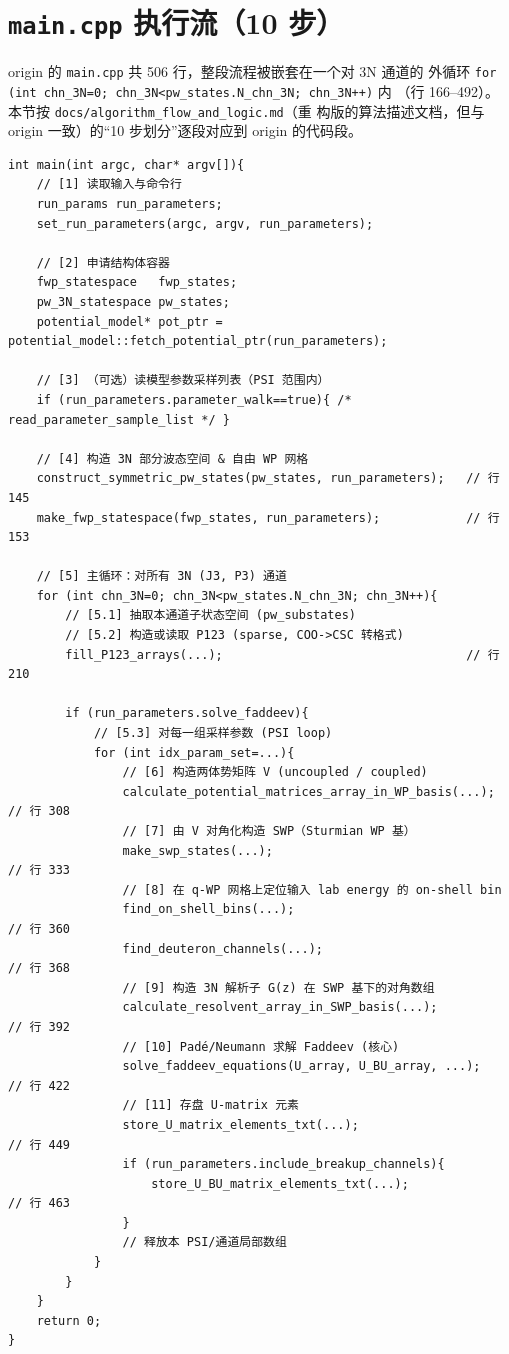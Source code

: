 \section{\texttt{main.cpp} 执行流（10 步）}
\label{sec:ch18-mainflow}

origin 的 \texttt{main.cpp} 共 506 行，整段流程被嵌套在一个对 3N 通道的
外循环 \texttt{for (int chn\_3N=0; chn\_3N<pw\_states.N\_chn\_3N; chn\_3N++)} 内
（行 166--492）。本节按 \texttt{docs/algorithm\_flow\_and\_logic.md}（重
构版的算法描述文档，但与 origin 一致）的“10 步划分”逐段对应到 origin
的代码段。

\begin{lstlisting}[style=cpp, caption={\texttt{main.cpp} 顶层 10 步骨架（节
选 origin 行 83--505）。},
                   label={lst:ch18-main-snippet}]
int main(int argc, char* argv[]){
    // [1] 读取输入与命令行
    run_params run_parameters;
    set_run_parameters(argc, argv, run_parameters);

    // [2] 申请结构体容器
    fwp_statespace   fwp_states;
    pw_3N_statespace pw_states;
    potential_model* pot_ptr = potential_model::fetch_potential_ptr(run_parameters);

    // [3] （可选）读模型参数采样列表（PSI 范围内）
    if (run_parameters.parameter_walk==true){ /* read_parameter_sample_list */ }

    // [4] 构造 3N 部分波态空间 & 自由 WP 网格
    construct_symmetric_pw_states(pw_states, run_parameters);   // 行 145
    make_fwp_statespace(fwp_states, run_parameters);            // 行 153

    // [5] 主循环：对所有 3N (J3, P3) 通道
    for (int chn_3N=0; chn_3N<pw_states.N_chn_3N; chn_3N++){
        // [5.1] 抽取本通道子状态空间 (pw_substates)
        // [5.2] 构造或读取 P123 (sparse, COO->CSC 转格式)
        fill_P123_arrays(...);                                  // 行 210

        if (run_parameters.solve_faddeev){
            // [5.3] 对每一组采样参数 (PSI loop)
            for (int idx_param_set=...){
                // [6] 构造两体势矩阵 V (uncoupled / coupled)
                calculate_potential_matrices_array_in_WP_basis(...); // 行 308
                // [7] 由 V 对角化构造 SWP（Sturmian WP 基）
                make_swp_states(...);                                // 行 333
                // [8] 在 q-WP 网格上定位输入 lab energy 的 on-shell bin
                find_on_shell_bins(...);                             // 行 360
                find_deuteron_channels(...);                         // 行 368
                // [9] 构造 3N 解析子 G(z) 在 SWP 基下的对角数组
                calculate_resolvent_array_in_SWP_basis(...);         // 行 392
                // [10] Padé/Neumann 求解 Faddeev (核心)
                solve_faddeev_equations(U_array, U_BU_array, ...);   // 行 422
                // [11] 存盘 U-matrix 元素
                store_U_matrix_elements_txt(...);                    // 行 449
                if (run_parameters.include_breakup_channels){
                    store_U_BU_matrix_elements_txt(...);             // 行 463
                }
                // 释放本 PSI/通道局部数组
            }
        }
    }
    return 0;
}
\end{lstlisting}

